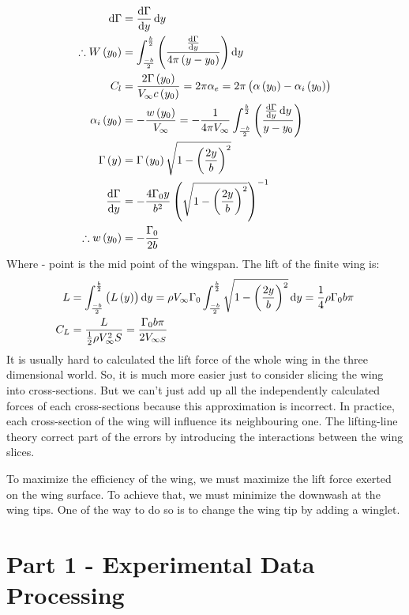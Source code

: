 \documentclass[11pt]{article}
\begin{document}
\begin{align}
  \dif \Gamma &= \frac{\dif \Gamma}{\dif y} \dif y\\
  \therefore W\left(y_0\right) &= \int_{\frac{-b}{2}}^{\frac{b}{2}} \left(\frac{\frac{\dif \Gamma}{\dif y}}{4\pi \left(y-y_0\right)}\right) \dif y\\
  C_l &= \frac{2\Gamma\left(y_0\right)}{V_{\infty}c\left(y_0\right)} = 2\pi \alpha_e = 2\pi\left(\alpha\left(y_0\right) - \alpha_i \left(y_0\right)\right)\\
  \alpha_i \left( y_0 \right) &= -\frac{w\left( y_0 \right)}{V_{\infty}} = -\frac{1}{4\pi V_{\infty}} \int_{\frac{-b}{2}}^{\frac{b}{2}} \left( \frac{\frac{\dif \Gamma}{\dif y}\dif y}{y - y_0} \right)\\
  \Gamma \left(y\right) &= \Gamma \left(y_0\right) \sqrt{1 - \left(\frac{2y}{b}\right)^2}\\
  \frac{\dif \Gamma}{\dif y} &= -\frac{4\Gamma_0 y}{b^2} \left(\sqrt{1-\left(\frac{2y}{b}\right)^2}\right)^{-1}\\
  \therefore w\left(y_0\right) &= -\frac{\Gamma_0}{2b}
\end{align}
Where - point is the mid point of the wingspan. The lift of the finite wing is:
\begin{align}
  L &= \int_{\frac{-b}{2}}^{\frac{b}{2}} \left(L\left(y\right)\right)\dif y = \rho V_{\infty} \Gamma_0 \int_{\frac{-b}{2}}^{\frac{b}{2}} \sqrt{1-\left(\frac{2y}{b}\right)^2} \dif y = \frac{1}{4}\rho \Gamma_0 b\pi\\
  C_L &= \frac{L}{\frac{1}{2}\rho V_{\infty}^2 S} = \frac{\Gamma_0 b \pi}{2V_{\infty S}}
\end{align}
It is usually hard to calculated the lift force of the whole wing in the three dimensional world. So, it is much more easier just to consider slicing the wing into cross-sections. But we can’t just add up all the independently calculated forces of each cross-sections because this approximation is incorrect. In practice, each cross-section of the wing will influence its neighbouring one. The lifting-line theory correct part of the errors by introducing the interactions between the wing slices. 

To maximize the efficiency of the wing, we must maximize the lift force exerted on the wing surface. To achieve that, we must minimize the downwash at the wing tips. One of the way to do so is to change the wing tip by adding a winglet.
\section*{Part 1 - Experimental Data Processing}
\end{document}
